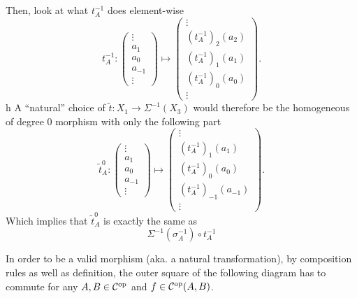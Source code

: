 \begin{question}
    Then, look at what \( t^{-1}_A \) does element-wise
    \[
        t^{-1}_A:
        \begin{pmatrix}
            \vdots \\
            a_1 \\
            a_0 \\
            a_{-1} \\
            \vdots
        \end{pmatrix}
        \mapsto
        \begin{pmatrix}
            \vdots \\
            (t^{-1}_A)_2(a_2) \\
            (t^{-1}_A)_1(a_1) \\
            (t^{-1}_A)_0(a_0) \\
            \vdots
        \end{pmatrix}.
    \]h
    A ``natural'' choice of \( \tilde{t}: X_1 \to \Sigma^{-1}(X_3) \) would therefore be the homogeneous of degree \( 0 \) morphism with only the following part
    \[
        \tilde{t}^0_A:
        \begin{pmatrix}
            \vdots \\
            a_1 \\
            a_0 \\
            a_{-1} \\
            \vdots
        \end{pmatrix}
        \mapsto
        \begin{pmatrix}
            \vdots \\
            (t^{-1}_A)_1(a_1) \\
            (t^{-1}_A)_0(a_0) \\
            (t^{-1}_A)_{-1}(a_{-1}) \\
            \vdots
        \end{pmatrix}.
    \]
    Which implies that \( \tilde{t}_A^0 \) is exactly the same as
    \[
        \Sigma^{-1}(\sigma_A^{-1}) \circ t_A^{-1}
    \]
    
    In order to be a valid morphism (aka. a natural transformation), by composition rules as well as definition, the outer square of the following diagram has to commute for any \( A, B \in {\mathcal{C}}^{\operatorname{op}} \) and \( f \in {\mathcal{C}}^{\operatorname{op}}(A, B) \).
    \begin{center}
\end{center}
\end{question}
